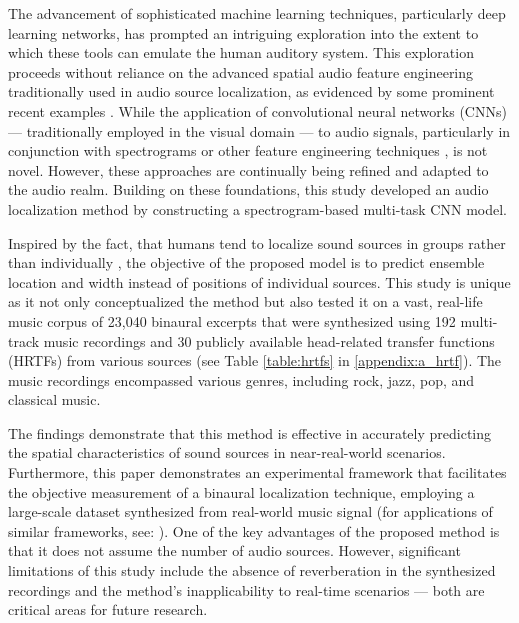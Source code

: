 \documentclass{article}
\begin{document}
The advancement of sophisticated machine learning techniques, particularly deep learning networks, has prompted an intriguing exploration into the extent to which these tools can emulate the human auditory system. This exploration proceeds without reliance on the advanced spatial audio feature engineering traditionally used in audio source localization, as evidenced by some prominent recent examples \parencite{yang_deepear_2022, vera-diaz_towards_2018, pang_multitask_2019}. While the application of convolutional neural networks (CNNs) \parencite{lecun_handwritten_1989} --- traditionally employed in the visual domain --- to audio signals, particularly in conjunction with spectrograms \parencite{thomas_analyzing_2014, espi_exploiting_2015} or other feature engineering techniques \parencite{abdel-hamid_applying_2012, sainath_deep_2013}, is not novel. However, these approaches are continually being refined and adapted to the audio realm. Building on these foundations, this study developed an audio localization method by constructing a spectrogram-based multi-task CNN model.

Inspired by the fact, that humans tend to localize sound sources in groups rather than individually \parencite{bregman_auditory_1990, rumsey_spatial_2002}, the objective of the proposed model is to predict ensemble location and width instead of positions of individual sources. This study is unique as it not only conceptualized the method but also tested it on a vast, real-life music corpus of 23,040 binaural excerpts that were synthesized using 192 multi-track music recordings \parencite{senior_mixing_2023} and 30 publicly available head-related transfer functions (HRTFs) from various sources (see Table \ref{table:hrtfs} in \ref{appendix:a_hrtf}). The music recordings encompassed various genres, including rock, jazz, pop, and classical music.

The findings demonstrate that this method is effective in accurately predicting the spatial characteristics of sound sources in near-real-world scenarios. Furthermore, this paper demonstrates an experimental framework that facilitates the objective measurement of a binaural localization technique, employing a large-scale dataset synthesized from real-world music signal (for applications of similar frameworks, see: \cite{antoniuk_blind_2023, zielinski_automatic_2022, zielinski_spatial_2022, zielinski_comparison_2020}). One of the key advantages of the proposed method is that it does not assume the number of audio sources. However, significant limitations of this study include the absence of reverberation in the synthesized recordings and the method's inapplicability to real-time scenarios --- both are critical areas for future research.
\end{document}
